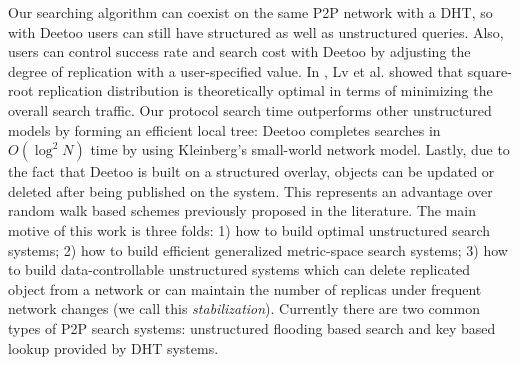 \documentclass[conference]{IEEEtran}
\begin{document}

Our searching algorithm can coexist on the same P2P network
with a DHT, so with Deetoo
users can still have structured as well as unstructured queries.
Also, users can control success rate and search cost with Deetoo by 
adjusting the degree of replication with a user-specified value.
In \cite{LCKS02}, Lv et al. showed that
square-root replication distribution is theoretically optimal in
terms of minimizing the overall search traffic. 
Our protocol search time outperforms other unstructured models by forming 
an efficient local tree: 
Deetoo completes searches in  
$O(\log^2{N})$ time by using Kleinberg's small-world network model.  
Lastly, due to the fact that Deetoo is built on a structured overlay,
objects can be updated or deleted after being published on the
system.  This represents an advantage over random
walk based schemes previously proposed in the literature.
\iffalse
The main motive of this work is three folds: 1) how to build optimal unstructured 
search systems; 2) how to build efficient generalized metric-space search systems;
3) how to build data-controllable unstructured systems which can delete replicated
object from a network or can maintain the number of replicas under frequent network 
changes (we call this \textit{stabilization}).
Currently there are two common types of P2P search systems: 
unstructured flooding based search and key based lookup provided by DHT systems.
\end{document}
